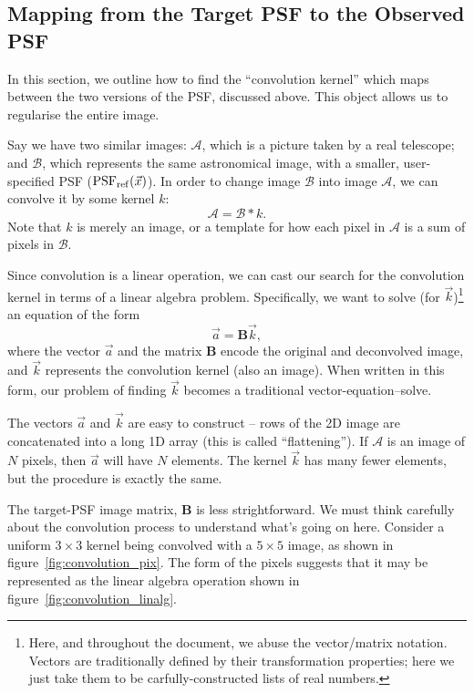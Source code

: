 \documentclass[letterpaper, 11pt]{article}
\def\psfref{\ensuremath{{\rm PSF_{ref}}}\xspace}
\begin{document}
\subsection{Mapping from the Target PSF to the Observed PSF}
\label{sec:kernel}

In this section, we outline how to find the ``convolution kernel'' which maps between the two versions of the PSF, discussed above. This object allows us to regularise the entire image.

Say we have two similar images: $\mathcal{A}$, which is a picture taken by a real telescope; and $\mathcal{B}$, which represents the same astronomical image, with a smaller, user-specified PSF ($\psfref(\vec x)$). In order to change image $\mathcal B$ into image $\mathcal A$, we can convolve it by some kernel $k$:
\begin{equation}
	\mathcal A = \mathcal B \ast k.
\end{equation}
Note that $k$ is merely an image, or a template for how each pixel in $\mathcal A$ is a sum of pixels in $\mathcal B$.

Since convolution is a linear operation, we can cast our search for the convolution kernel in terms of a linear algebra problem. Specifically, we want to solve (for $\vec k$)\footnote{Here, and throughout the document, we abuse the vector/matrix notation. Vectors are traditionally defined by their transformation properties; here we just take them to be carfully-constructed lists of real numbers.} an equation of the form
\begin{equation}\label{eqn:vector}
	\vec a = \mathbf{B} \vec k,
\end{equation}
where the vector $\vec a$ and the matrix $\mathbf{B}$ encode the original and deconvolved image, and $\vec k$ represents the convolution kernel (also an image). When written in this form, our problem of finding $\vec k$ becomes a traditional vector-equation--solve.

The vectors $\vec a$ and $\vec k$ are easy to construct -- rows of the 2D image are concatenated into a long 1D array (this is called ``flattening''). If $\mathcal A$ is an image of $N$ pixels, then $\vec a$ will have $N$ elements. The kernel $\vec k$ has many fewer elements, but the procedure is exactly the same.

The target-PSF image matrix, $\mathbf B$ is less strightforward. We must think carefully about the convolution process to understand what's going on here. Consider a uniform $3\!\times\!3$ kernel being convolved with a $5\!\times\!5$ image, as shown in figure~\ref{fig:convolution_pix}. The form of the pixels suggests that it may be represented as the linear algebra operation shown in figure~\ref{fig:convolution_linalg}.
\end{document}
